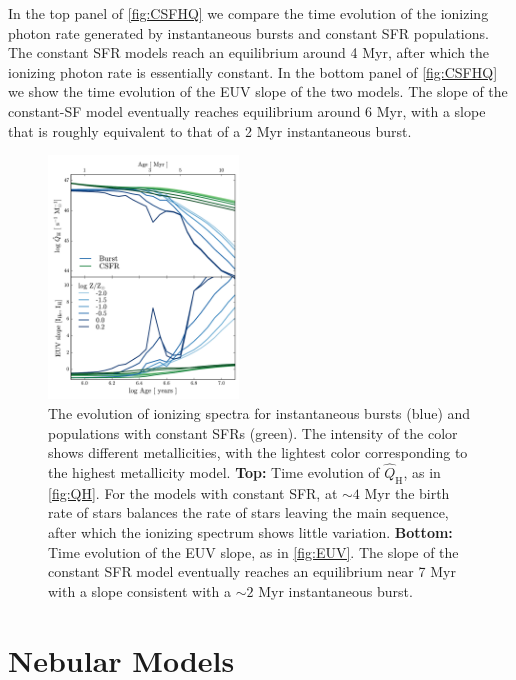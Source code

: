 \documentclass[twocolumn, tighten]{aastex61}
\newcommand{\Fig}[1]{\autoref{fig:#1}}
\newcommand{\QHat}{\ensuremath{\hat{Q}_{\mathrm{H}}}}
\begin{document}
In the top panel of \Fig{CSFHQ} we compare the time evolution of the ionizing photon rate generated by instantaneous bursts and constant SFR populations. The constant SFR models reach an equilibrium around 4 Myr, after which the ionizing photon rate is essentially constant. In the bottom panel of \Fig{CSFHQ} we show the time evolution of the EUV slope of the two models. The slope of the constant-SF model eventually reaches equilibrium around 6 Myr, with a slope that is roughly equivalent to that of a 2 Myr instantaneous burst.

\begin{figure}%
  \begin{centering}
    \includegraphics[width=0.45\textwidth]{f4.pdf}
    \caption{The evolution of ionizing spectra for instantaneous bursts (blue) and populations with constant SFRs (green). The intensity of the color shows different metallicities, with the lightest color corresponding to the highest metallicity model. \textbf{Top: } Time evolution of \QHat{}, as in \Fig{QH}. For the models with constant SFR, at ${\sim}4$ Myr the birth rate of stars balances the rate of stars leaving the main sequence, after which the ionizing spectrum shows little variation. \textbf{Bottom: } Time evolution of the EUV slope, as in \Fig{EUV}. The slope of the constant SFR model eventually reaches an equilibrium near 7 Myr with a slope consistent with a ${\sim}2$ Myr instantaneous burst.}
    \label{fig:CSFHQ}
  \end{centering}
\end{figure}

\section{Nebular Models}\label{sec:models}
\end{document}
